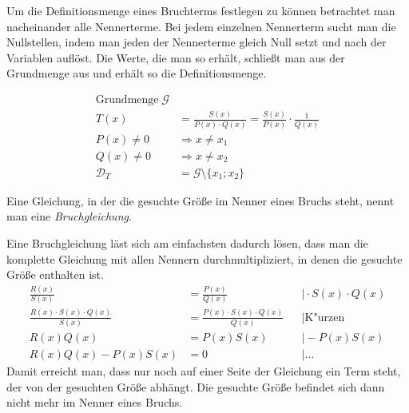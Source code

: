 \begin{regel}
 Um die Definitionsmenge eines Bruchterms festlegen zu können betrachtet man nacheinander alle Nennerterme. Bei jedem einzelnen Nennerterm sucht man die Nullstellen, indem man jeden der Nennerterme gleich Null setzt und nach der Variablen auflöst. Die Werte, die man so erhält, schließt man aus der Grundmenge aus und erhält so die Definitionsmenge.
 
 \begin{align*}
  \text{Grundmenge}\;\mathcal{G}\\
  T(x) &=\frac{S(x)}{P(x)\cdot Q(x)} = \frac{S(x)}{P(x)}\cdot \frac{1}{Q(x)}\\
  P(x) \ne 0 &\Rightarrow x \ne x_1 \\
  Q(x) \ne 0 &\Rightarrow x \ne x_2 \\
  \mathcal{D}_T &= \mathcal{G}\setminus \lbrace x_1 ; x_2 \rbrace
 \end{align*}

\end{regel}

\begin{defi}[Bruchgleichung]
 Eine Gleichung, in der die gesuchte Größe im Nenner eines Bruchs steht, nennt man eine \emph{Bruchgleichung}.
\end{defi}

\begin{regel}
 Eine Bruchgleichung läst sich am einfachsten dadurch lösen, dass man die komplette Gleichung mit allen Nennern durchmultipliziert, in denen die gesuchte Größe enthalten ist.
 \begin{align*}
  \frac{R(x)}{S(x)} &= \frac{P(x)}{Q(x)}&& \vert \cdot S(x)\cdot Q(x)\\
  \frac{R(x)\cdot S(x) \cdot Q(x)}{S(x)} &= \frac{P(x)\cdot S(x) \cdot Q(x)}{Q(x)} &&\vert \text{K"urzen}\\
  R(x)Q(x) &= P(x)S(x) &&\vert -P(x)S(x) \\
  R(x)Q(x)-P(x)S(x) &= 0 &&\vert  \ldots
 \end{align*}
 Damit erreicht man, dass nur noch auf einer Seite der Gleichung ein Term steht, der von der gesuchten Größe abhängt. Die gesuchte Größe befindet sich dann nicht mehr im Nenner eines Bruchs.
\end{regel}

